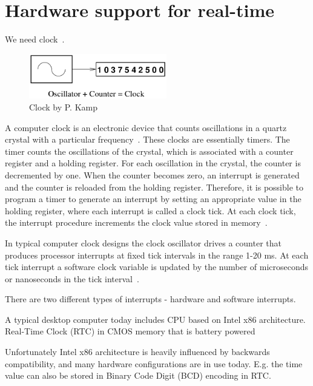 
\chapter{Hardware support for real-time}
We need clock~\cite{timecounters}.
\begin{figure}
	\centering
	\includegraphics[width=6cm,keepaspectratio]{fig/clock.png}
	\caption{Clock by P. Kamp}
	\label{fig:hw-clock}
\end{figure}

A computer clock is an electronic device that counts oscillations in a
quartz crystal with a particular frequency~\cite{thesis-sync}.
These clocks are essentially timers.
The timer counts the oscillations of the crystal, which is associated with
a counter register and a holding register.
For each oscillation in the crystal, the counter is decremented by one.
When the counter becomes zero, an interrupt is generated and the
counter is reloaded from the holding register.
Therefore, it is possible to
program a timer to generate an interrupt by setting an appropriate value in
the holding register, where each interrupt is called a clock tick.
At each clock tick,
the interrupt procedure increments the clock value stored in memory~\cite{thesis-sync}.

In typical computer clock designs the clock oscillator drives a counter that produces processor interrupts at
fixed tick intervals in the range 1-20 ms.
At each tick interrupt a software clock variable is updated by the
number of microseconds or nanoseconds in the tick interval~\cite{timecounters}.


There are two different types of interrupts - hardware and software interrupts.

A typical desktop computer today includes CPU based on Intel x86 architecture.
Real-Time Clock (RTC) in CMOS memory that is battery powered

Unfortunately Intel x86 architecture is heavily influenced by backwards compatibility,
and many hardware configurations are in use today.
E.g. the time value can also be stored in Binary Code Digit (BCD) encoding in RTC.

